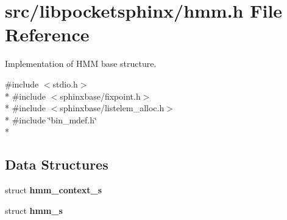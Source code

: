 \section{src/libpocketsphinx/hmm.h File Reference}
\label{hmm_8h}


Implementation of H\+M\+M base structure.  


{\ttfamily \#include $<$stdio.\+h$>$}\\*
{\ttfamily \#include $<$sphinxbase/fixpoint.\+h$>$}\\*
{\ttfamily \#include $<$sphinxbase/listelem\+\_\+alloc.\+h$>$}\\*
{\ttfamily \#include \char`\"{}bin\+\_\+mdef.\+h\char`\"{}}\\*
\subsection*{Data Structures}
\begin{DoxyCompactItemize}
\item 
struct {\bf hmm\+\_\+context\+\_\+s}
\item 
struct {\bf hmm\+\_\+s}
\end{DoxyCompactItemize}
